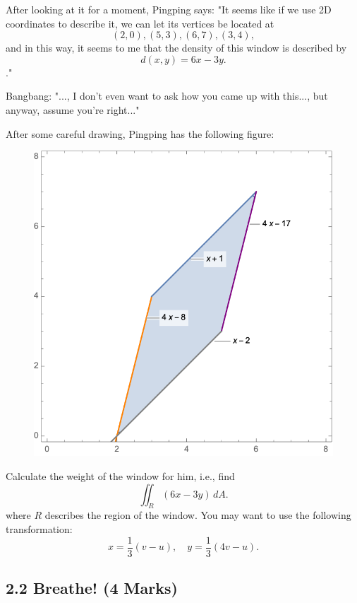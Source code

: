 \documentclass[12pt]{article}
\begin{document}
After looking at it for a moment, Pingping says: "It seems like if we use 2D coordinates to describe it, we can 
let its vertices be located at
\begin{equation*}
    (2,0), (5,3), (6,7), (3,4), 
\end{equation*}
and in this way, it seems to me that the density of this window is described by 
\begin{equation*}
    d(x,y) = 6x-3y.
\end{equation*}
." 
\par Bangbang: "..., I don't even want to ask how you came up with this..., but anyway, assume you're right..."

\par After some careful drawing, Pingping has the following figure:
\begin{figure}[H]
    \centering
    \includegraphics[width = 0.7\linewidth]{Figure/2.1.png}
\end{figure}

Calculate the weight of the window for him, i.e., find
\begin{equation*}
    \iint_R (6x-3y) \,dA.
\end{equation*}
where $R$ describes the region of the window. You may want to use the following transformation:
\begin{equation*}
    x = \frac{1}{3}(v - u), \quad y = \frac{1}{3}(4v - u).
\end{equation*}

\subsection*{2.2 Breathe! (4 Marks)}
\end{document}
